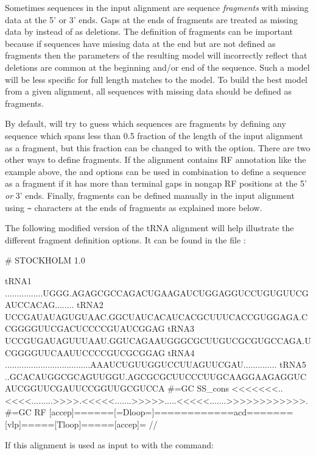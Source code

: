 Sometimes sequences in the  input alignment are sequence
\emph{fragments} with missing data at the 5' or 3' ends. Gaps at the
ends of fragments are treated as missing data by 
instead of as deletions. The definition of fragments can be important
because if sequences have missing data at the end but are not
defined as fragments then the parameters of the resulting model will
incorrectly reflect that deletions are common at the beginning and/or end of the
sequence. Such a model will be less specific for full length matches
to the model. To build the best model from a given alignment, all sequences
with missing data should be defined as fragments.

By default,  will try to guess which sequences are
fragments by defining any sequence which spans less than 0.5 fraction of the
length of the input alignment as a fragment, but this
fraction can be changed to  with the 
option. There are two other ways to define fragments. If the
alignment contains RF annotation like the example above, the 
 and  options can be used in
combination to define a sequence as a fragment if it has more than
 terminal gaps in nongap RF positions at the 5' \emph{or} 3'
ends. Finally, fragments can be defined manually in the input alignment
using \verb+~+ characters at the ends of fragments as explained more below.

The following modified version of the tRNA alignment will help
illustrate the different fragment definition options. It can be found in
the file :

\begin{sreoutput}
# STOCKHOLM 1.0

tRNA1             ................UGGG.AGAGCGCCAGACUGAAGAUCUGGAGGUCCUGUGUUCGAUCCACAG........
tRNA2             UCCGAUAUAGUGUAAC.GGCUAUCACAUCACGCUUUCACCGUGGAGA.CCGGGGUUCGACUCCCCGUAUCGGAG
tRNA3             UCCGUGAUAGUUUAAU.GGUCAGAAUGGGCGCUUGUCGCGUGCCAGA.UCGGGGUUCAAUUCCCCGUCGCGGAG
tRNA4             ....................................AAAUCUGUUGGUCCUUAGUUCGAU..............
tRNA5             ..GCACAUGGCGCAGUUGGU.AGCGCGCUUCCCUUGCAAGGAAGAGGUCAUCGGUUCGAUUCCGGUUGCGUCCA
#=GC SS_cons      <<<<<<<..<<<<.........>>>>.<<<<<.......>>>>>.....<<<<<.......>>>>>>>>>>>>.
#=GC RF           [accep]======[=Dloop=]============acd=======[vlp]=====[Tloop]=====[accep]=
//
\end{sreoutput}

If this alignment is used as input to  with the command:

